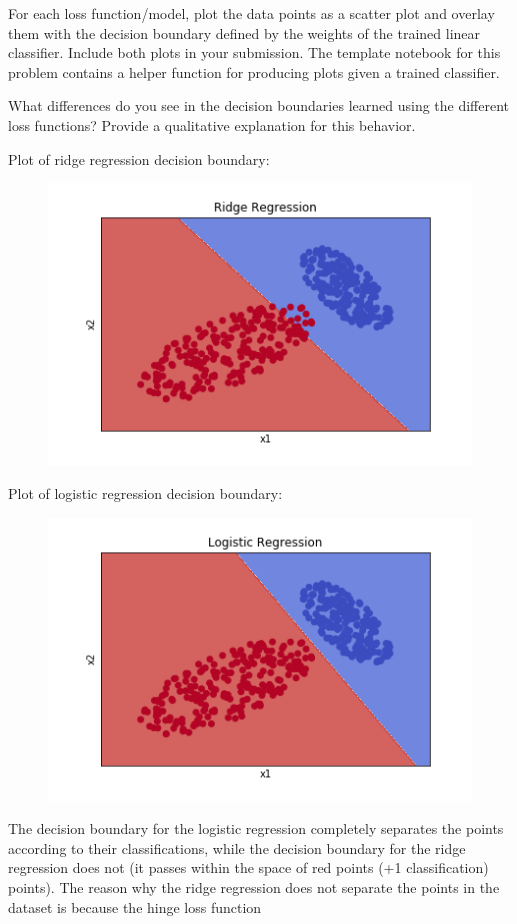 For each loss function/model, plot the data points as a scatter plot and overlay them with the decision boundary defined by the weights of the trained linear classifier.  Include both plots in your submission. The template notebook for this problem contains a helper function for producing plots given a trained classifier.

What differences do you see in the decision boundaries learned using the different loss functions? Provide a qualitative explanation for this behavior.

Plot of ridge regression decision boundary:
\noindent
\begin{figure}[H]
\centering
\includegraphics[scale=0.6]{1b_plot_ridge.png}
\end{figure}
\noindent

Plot of logistic regression decision boundary:
\noindent
\begin{figure}[H]
\centering
\includegraphics[scale=0.6]{1b_plot_logistic.png}
\end{figure}
\noindent

The decision boundary for the logistic regression completely separates the points according to their classifications, while the decision boundary for the ridge regression does not (it passes within the space of red points (+1 classification) points). The reason why the ridge regression does not separate the points in the dataset is because the hinge loss function 

